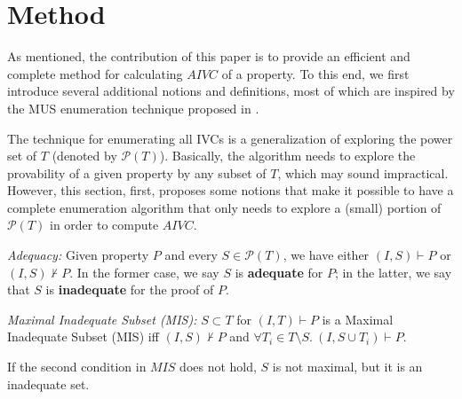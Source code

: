 \section{Method}
\label{sec:allivcs}

\newcommand{\getivc}{\textsc{GetIVC}}

\newcommand{\blockup}{\textsc{BlockUp}}
\newcommand{\blockdown}{\textsc{BlockDown}}
\newcommand{\minivc}{\textsc{MinimizeIvc}\xspace}

\newcommand{\checksat}{\textsc{CheckSat}}
\newcommand{\isadeq}{\textsc{CheckAdq}}
\newcommand{\actlit}{\textsc{ActLit}}
\newcommand{\unsatcore}{\textsc{UnsatCore}\xspace}
\newcommand{\unsat}{\texttt{UNSAT}\xspace}
\newcommand{\sat}{\texttt{SAT}\xspace}

As mentioned, the contribution of this paper is to provide an efficient and complete method for calculating $AIVC$ of a property. To this end, we first introduce several additional notions and definitions, most of which are inspired by the MUS enumeration technique proposed in \cite{marco2016fast}.

The technique for enumerating all IVCs is a generalization of exploring the power set of $T$ (denoted by $ \mathcal{P}(T) $).
Basically, the algorithm needs to explore the provability of a
given property by any subset of $T$, which may sound impractical.
However, this section, first, proposes some notions that make it possible to have a complete
enumeration algorithm that only needs to explore a (small) portion of $\mathcal{P}(T)$
in order to compute $AIVC$.

\begin{definition} {\emph{Adequacy:}}
\label{def:adeq}
Given property $P$ and every $S \in \mathcal{P}(T)$, we have either $(I, S) \vdash P$ or $(I, S) \nvdash P$. In the former case, we say $S$ is \textbf{adequate} for $P$; in the latter, we say that $S$ is \textbf{inadequate} for the proof of $P$.
\end{definition}

\begin{definition}{\emph{Maximal Inadequate Subset (MIS):}}
  \label{def:mis}
  $S \subset T$ for $(I, T) \vdash P$ is a Maximal Inadequate Subset (MIS) iff
  $(I, S) \nvdash P$ and $\forall T_i \in T\setminus S.~ (I, S\cup{T_i}) \vdash P$.
\end{definition}
\begin{note}
If the second condition in $MIS$ does not hold, $S$ is not maximal, but it is an inadequate set.
\end{note}

